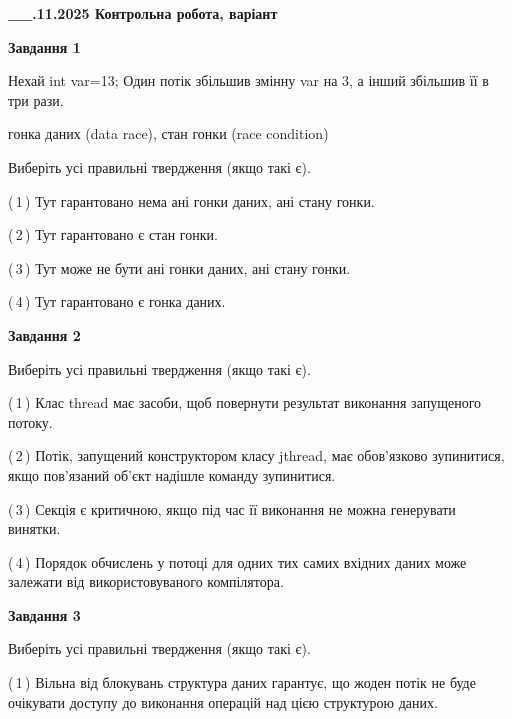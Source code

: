 \documentclass[12pt, ukrainian]{article}
\begin{document}
\begin {large}

\textbf{\_\_.11.2025 Контрольна робота, варіант  }\par


{

\begin{center}
\textbf{Завдання 1}
\end{center}
Нехай int var=13; Один потік збільшив змінну var на 3, а інший збільшив її в три рази.

гонка даних (data race), стан гонки (race condition)

Виберіть усі правильні твердження (якщо такі є).\par
\vspace{2mm}
(\,1\,) Тут гарантовано нема ані гонки даних, ані стану гонки.%

(\,2\,) Тут гарантовано є стан гонки.%

(\,3\,) Тут може не бути ані гонки даних, ані стану гонки.%

(\,4\,) Тут гарантовано є гонка даних.%



\begin{center}
\textbf{Завдання 2}
\end{center}
Виберіть усі правильні твердження (якщо такі є).\par
\vspace{2mm}

(\,1\,) Клас thread має засоби, щоб повернути результат виконання запущеного потоку.%

(\,2\,) Потік, запущений конструктором класу jthread, має обов’язково зупинитися, якщо пов’язаний об’єкт надішле команду зупинитися.%

(\,3\,) Секція є критичною, якщо під час її виконання не можна генерувати винятки.%

(\,4\,) Порядок обчислень у потоці для одних тих самих вхідних даних може залежати від використовуваного компілятора.%



\begin{center}
\textbf{Завдання 3}
\end{center}
Виберіть усі правильні твердження (якщо такі є).\par
\vspace{2mm}

(\,1\,) Вільна від блокувань структура даних гарантує, що жоден потік не буде очікувати доступу до виконання операцій над цією структурою даних.%

}
\end{large}
\end{document}
